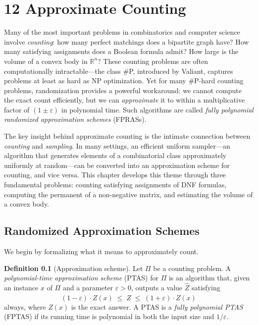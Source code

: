 \documentclass[twoside,12pt]{book}
\theoremstyle{plain}
\theoremstyle{definition}
\newtheorem{definition}[theorem]{Definition}
\theoremstyle{remark}
\begin{document}
\chapter*{12 Approximate Counting}
\label{ch:approximate-counting}

Many of the most important problems in combinatorics and computer science involve \emph{counting}: how many perfect matchings does a bipartite graph have? How many satisfying assignments does a Boolean formula admit? How large is the volume of a convex body in $\mathbb{R}^n$? These counting problems are often computationally intractable---the class \#P, introduced by Valiant, captures problems at least as hard as NP optimization. Yet for many \#P-hard counting problems, randomization provides a powerful workaround: we cannot compute the exact count efficiently, but we can \emph{approximate} it to within a multiplicative factor of $(1 \pm \varepsilon)$ in polynomial time. Such algorithms are called \emph{fully polynomial randomized approximation schemes} (FPRASs).

The key insight behind approximate counting is the intimate connection between \emph{counting} and \emph{sampling}. In many settings, an efficient uniform sampler---an algorithm that generates elements of a combinatorial class approximately uniformly at random---can be converted into an approximation scheme for counting, and vice versa. This chapter develops this theme through three fundamental problems: counting satisfying assignments of DNF formulas, computing the permanent of a non-negative matrix, and estimating the volume of a convex body.

\section{Randomized Approximation Schemes}
\label{sec:approx-schemes}

We begin by formalizing what it means to approximately count.

\begin{definition}[Approximation scheme]
Let $\Pi$ be a counting problem. A \emph{polynomial-time approximation scheme} (PTAS) for $\Pi$ is an algorithm that, given an instance $x$ of $\Pi$ and a parameter $\varepsilon > 0$, outputs a value $\hat{Z}$ satisfying
\[
(1 - \varepsilon) \cdot Z(x) \;\leq\; \hat{Z} \;\leq\; (1 + \varepsilon) \cdot Z(x)
\]
always, where $Z(x)$ is the exact answer. A PTAS is a \emph{fully polynomial PTAS} (FPTAS) if its running time is polynomial in both the input size and $1/\varepsilon$.
\end{definition}
\end{document}
